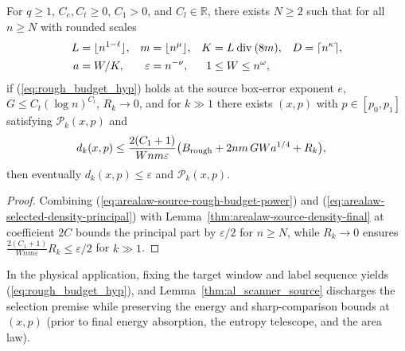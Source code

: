 \begin{lemma}
    \label{thm:arealaw-selected-density-power}
    \leanok
    For $q\ge1$, $C_e,C_t\ge0$, $C_1>0$, and $C_l\in\mathbb R$, there exists $N\ge2$ such that for all $n\ge N$ with rounded scales
    \begin{align}
        L & =\lfloor n^{1-\ell}\rfloor,   &
        m & =\lfloor n^\mu\rfloor,        &
        K & =L\mathbin{\mathrm{div}}(8m), &
        D & =\lceil n^\kappa\rceil,\notag                                                            \\
        a & =W/K,                         & \varepsilon & =n^{-\nu}, & 1 & \le W\le n^\omega, \notag
    \end{align}
    if (\ref{eq:rough_budget_hyp}) holds at the source box-error exponent $e$, $G\le C_t(\log n)^{C_l}$, $R_k\to0$, and for $k\gg1$ there exists $(x,p)$ with $p\in[p_0,p_1]$ satisfying $\mathcal P_k(x,p)$ and
    \begin{align}
        d_k(x,p) & \le\frac{2(C_1+1)}{Wnm\varepsilon}
        \bigl(B_{\rm rough}+2nm\,GW a^{1/4}+R_k\bigr), \notag
    \end{align}
    then eventually $d_k(x,p)\le\varepsilon$ and $\mathcal P_k(x,p)$.
\end{lemma}
\begin{proof}
    \leanok
    Combining (\ref{eq:arealaw-source-rough-budget-power}) and (\ref{eq:arealaw-selected-density-principal}) with Lemma~\ref{thm:arealaw-source-density-final} at coefficient $2C$ bounds the principal part by $\varepsilon/2$ for $n\ge N$, while $R_k\to0$ ensures $\frac{2(C_1+1)}{Wnm\varepsilon}R_k\le\varepsilon/2$ for $k\gg1$.
\end{proof}

In the physical application, fixing the target window and label sequence yields (\ref{eq:rough_budget_hyp}), and Lemma~\ref{thm:al_scanner_source} discharges the selection premise while preserving the energy and sharp-comparison bounds at $(x,p)$ (prior to final energy absorption, the entropy telescope, and the area law).
